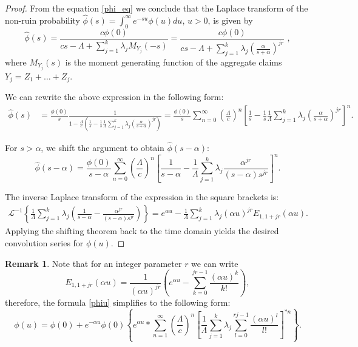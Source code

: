 \documentclass[12pt]{article}
\theoremstyle{definition}
\newtheorem{remark}{Remark}
\theoremstyle{plain}
\begin{document}
\begin{proof}
From the equation \eqref{phi_eq} we 
 conclude  that the Laplace transform of the non-ruin probability
$
	\hat{\phi}(s) = \int_0^\infty e^{-su} \phi(u) du
$, $u>0$,
is given by
\begin{equation*}
	\hat{\phi}(s) = \frac{c\phi(0)}{cs - \Lambda + \sum_{j=1}^k \lambda_j M_{Y_j}(-s)} = \frac{c\phi(0)}{cs - \Lambda + \sum_{j=1}^k \lambda_j \left(\frac{\alpha}{s+\alpha}\right)^{jr}}\,\,, 
\end{equation*}
where $M_{Y_j}(s)$ is the moment generating function of the aggregate claims $Y_j=Z_1+\ldots+Z_j$.

	We can rewrite the above expression in the following form:
	\begin{align*}
		\hat{\phi}(s) &= \frac{\phi(0)}{s} \frac{1}{1 - \frac{\Lambda}{c} \left( \frac{1}{s} -\frac{1}{s} \frac{1}{\Lambda} \sum_{j=1}^k \lambda_j \left(\frac{\alpha}{s+\alpha}\right)^{jr}\right)} %
		= \frac{\phi(0)}{s} \sum_{n=0}^{\infty} \left( \frac{\Lambda}{c} \right)^n \left[ \frac{1}{s} - \frac{1}{s} \frac{1}{\Lambda} \sum_{j=1}^k \lambda_j \left(\frac{\alpha}{s+\alpha}\right)^{jr} \right]^n.
	\end{align*}
	
	For $s > \alpha$, we shift the argument to obtain $\hat{\phi}(s - \alpha)$:
	\begin{equation*}
		\hat{\phi}(s - \alpha) = \frac{\phi(0)}{s - \alpha} \sum_{n=0}^{\infty} \left( \frac{\Lambda}{c} \right)^n \left[ \frac{1}{s - \alpha} - \frac{1}{\Lambda} \sum_{j=1}^k \lambda_j \frac{\alpha^{jr}}{(s - \alpha)s^{jr}} \right]^n.
	\end{equation*}
	
	
	The inverse Laplace transform of the expression in the square brackets is:
	\begin{align*}
		\mathcal{L}^{-1} \left\{ \frac{1}{\Lambda} \sum_{j=1}^k \lambda_j \left( \frac{1}{s - \alpha} - \frac{\alpha^{jr}}{(s - \alpha)s^{jr}} \right) \right\} 
		= e^{\alpha u} - \frac{1}{\Lambda} \sum_{j=1}^k \lambda_j (\alpha u)^{jr} E_{1,1+jr}(\alpha u).
	\end{align*}
	Applying the shifting theorem back to the time domain yields the desired convolution series for $\phi(u)$.
\end{proof}

\begin{remark}
Note that for an integer parameter $r$  we can write
$$
E_{1,1+jr}(\alpha u)=\frac{1}{(\alpha u)^{jr}}\left( e^{\alpha u}-\sum_{k=0}^{jr-1}\frac{(\alpha u)^k}{k!}\right),
$$
therefore, the formula \eqref{phiu} simplifies to the following form:
\begin{equation*}
		\phi(u) = \phi(0)+ e^{-\alpha u} \phi(0) \left\{ e^{\alpha u} \ast \sum_{n=1}^{\infty} \left( \frac{\Lambda}{c} \right)^n \left[  \frac{1}{\Lambda} \sum_{j=1}^k \lambda_j \sum_{l=0}^{rj-1}\frac{(\alpha u)^l}{l!} \right]^{\ast n} \right\}.
	\end{equation*}
\end{remark}
\end{document}
